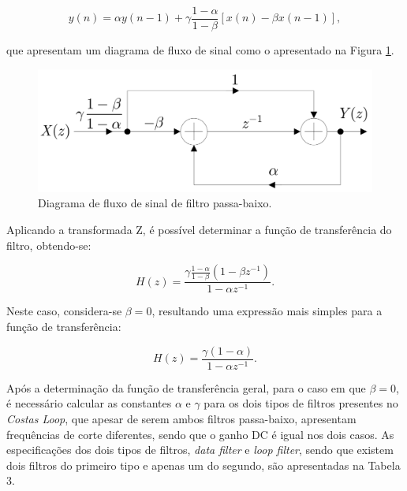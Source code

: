 \documentclass[11pt]{article}
\numberwithin{equation}{section}
\begin{document}
{\vspace{-3mm}
\begin{equation}
y(n) = \alpha y(n-1) + \gamma \frac{1-\alpha}{1-\beta}[x(n)-\beta x(n-1)],
\end{equation} 

\vspace{1mm}
que apresentam um diagrama de fluxo de sinal como o apresentado na Figura \ref{fig:fluxo}.

\begin{figure}[H]
	\centering
	\includegraphics[keepaspectratio=true, scale=0.20]{teoricas/diagrama_fluxo}
	\caption{Diagrama de fluxo de sinal de filtro passa-baixo.}
	\label{fig:fluxo}
	\vspace{-0.8em}
\end{figure}

Aplicando a transformada Z, é possível determinar a função de transferência do filtro, obtendo-se:

\vspace{-3mm}
\begin{equation}
H(z) = \frac{\gamma \frac{1-\alpha}{1-\beta} (1-\beta z^{-1})}{1-\alpha z^{-1}}.
\end{equation}
 
\vspace{1mm}
Neste caso, considera-se $\beta=0$, resultando uma expressão mais simples para a função de transferência:
 
\vspace{-3mm}
\begin{equation}
H(z) = \frac{\gamma(1-\alpha)}{1-\alpha z^{-1}}.
\end{equation} 

\vspace{1mm}
Após a determinação da função de transferência geral, para o caso em que $\beta = 0$, é necessário calcular as constantes $\alpha$ e $\gamma$ para os dois tipos de filtros presentes no \textit{Costas Loop}, que apesar de serem ambos filtros passa-baixo, apresentam frequências de corte diferentes, sendo que o ganho DC é igual nos dois casos. As especificações dos dois tipos de filtros, \textit{data filter} e \textit{loop filter}, sendo que existem dois filtros do primeiro tipo e apenas um do segundo, são apresentadas na Tabela 3. 

}
\end{document}
